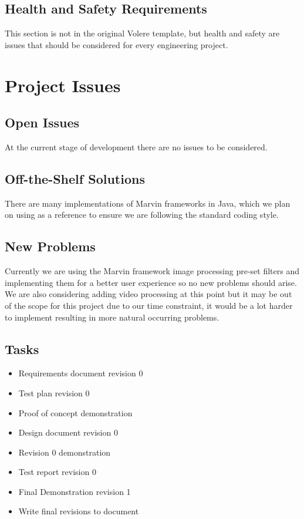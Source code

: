 \documentclass[12pt, titlepage]{article}
\begin{document}
\subsection{Health and Safety Requirements}

This section is not in the original Volere template, but health and safety are
issues that should be considered for every engineering project.

\section{Project Issues}

\subsection{Open Issues}
At the current stage of development there are no issues to be considered.

\subsection{Off-the-Shelf Solutions}

There are many implementations of Marvin frameworks in Java, which we plan on using as a reference to ensure we are following the standard coding style.

\subsection{New Problems}

Currently we are using the Marvin framework image processing pre-set filters and implementing them for a better user experience so no new problems should arise. We are also considering adding video processing at this point but it may be out of the scope for this project due to our time constraint, it would be a lot harder to implement resulting in more natural occurring problems.

\subsection{Tasks}

\begin{itemize}
\item Requirements document revision 0
\item Test plan revision 0
\item Proof of concept demonstration
\item Design document revision 0
\item Revision 0 demonstration
\item Test report revision 0
\item Final Demonstration revision 1  
\item Write final revisions to document
\end{itemize}
\end{document}
